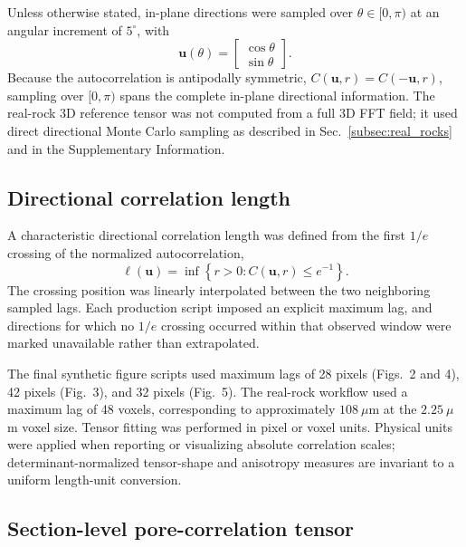 \documentclass{article}
\begin{document}
Unless otherwise stated, in-plane directions were sampled over
$\theta\in[0,\pi)$ at an angular increment of $5^{\circ}$, with
\begin{equation}
    \bm{u}(\theta)
    =
    \begin{bmatrix}
        \cos\theta\\
        \sin\theta
    \end{bmatrix}.
    \label{eq:2d_direction}
\end{equation}
Because the autocorrelation is antipodally symmetric,
$C(\bm{u},r)=C(-\bm{u},r)$, sampling over $[0,\pi)$ spans the complete
in-plane directional information. The real-rock 3D reference tensor was not
computed from a full 3D FFT field; it used direct directional Monte Carlo
sampling as described in Sec.~\ref{subsec:real_rocks} and in the
Supplementary Information.

\subsection{Directional correlation length}
\label{subsec:correlation_length}

A characteristic directional correlation length was defined from the first
$1/e$ crossing of the normalized autocorrelation,
\begin{equation}
    \ell(\bm{u})
    =
    \inf
    \left\{
        r>0:
        C(\bm{u},r)
        \leq e^{-1}
    \right\}.
    \label{eq:correlation_length}
\end{equation}
The crossing position was linearly interpolated between the two neighboring
sampled lags. Each production script imposed an explicit maximum lag, and
directions for which no $1/e$ crossing occurred within that observed window
were marked unavailable rather than extrapolated.

The final synthetic figure scripts used maximum lags of 28 pixels
(Figs.~2 and 4), 42 pixels (Fig.~3), and 32 pixels (Fig.~5).
The real-rock workflow used a maximum lag of 48 voxels, corresponding to
approximately $108~\mu$m at the $2.25~\mu$m voxel size. Tensor fitting was
performed in pixel or voxel units. Physical units were applied when reporting
or visualizing absolute correlation scales; determinant-normalized tensor-shape
and anisotropy measures are invariant to a uniform length-unit conversion.

\subsection{Section-level pore-correlation tensor}
\label{subsec:section_tensor}
\end{document}
